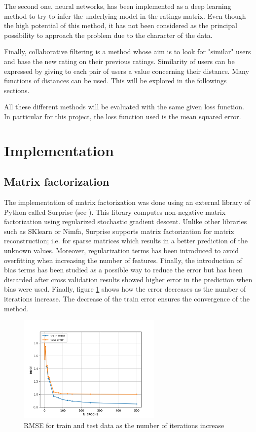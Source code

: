 \documentclass[11pt,conference]{IEEEtran}
\begin{document}
The second one, neural networks, has been implemented as a deep learning method to try to infer the underlying model in the ratings matrix. Even though the high potential of this method, it has not been considered as the principal possibility to approach the problem due to the character of the data. 

Finally, collaborative filtering is a method whose aim is to look for "similar" users and base the new rating on their previous ratings. Similarity of users can be expressed by giving to each pair of users a value concerning their distance. Many functions of distances can be used. This will be explored in the followings sections.

All these different methods will be evaluated with the same given loss function. In particular for this project, the loss function used is the mean squared error.

\section{Implementation}

\subsection{Matrix factorization}
The implementation of matrix factorization was done using an external library of Python called Surprise (see \cite{MF_Surprise}). This library computes non-negative matrix factorization using regularized stochastic gradient descent. Unlike other libraries such as SKlearn or Nimfa, Surprise supports matrix factorization for matrix reconstruction; i.e. for sparse matrices which results in a better prediction of the unknown values. Moreover, regularization terms has been introduced to avoid overfitting when increasing the number of features. Finally, the introduction of bias terms has been studied as a possible way to reduce the error but has been discarded after cross validation results showed higher error in the prediction when bias were used.
Finally, figure \ref{epochs} shows how the error decreases as the number of iterations increase. The decrease of the train error ensures the convergence of the method.
\begin{figure}[ht!]
	\centering
	\includegraphics[width=265px]{RMSE_N_EPOCHS.png}
	\caption{RMSE for train and test data as the number of iterations increase}
    \label{epochs}
\end{figure}
\end{document}
